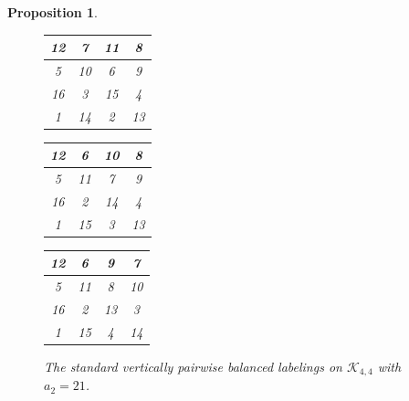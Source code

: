 \documentclass[10pt, reqno]{amsart}
\theoremstyle{definition}
\theoremstyle{plain}
\newtheorem{proposition}[definition]{Proposition}
\begin{document}
\begin{proposition}
\begin{figure}[hbt!]
    \centering
    \begin{tabular}{|c|c|c|c|} \hline
       12  &7  &11  &8  \\  \hline
        5  &10   &6   &9  \\  \hline
       16  &3   &15  &4  \\  \hline
        1  &14  &2   &13  \\  \hline
    \end{tabular}
\hspace{0.15in}\begin{tabular}{|c|c|c|c|} \hline
       12  &6 &10  &8  \\  \hline
        5  &11   &7   &9  \\  \hline
       16  &2   &14  &4  \\  \hline
        1  &15  &3   &13  \\  \hline
    \end{tabular}
\hspace{0.15in}\begin{tabular}{|c|c|c|c|} \hline
       12  &6  &9  &7  \\  \hline
        5  &11   &8   &10  \\  \hline
       16  &2   &13  &3  \\  \hline
        1  &15  &4   &14  \\  \hline
    \end{tabular}
    \caption{The standard vertically pairwise balanced labelings on
    $\mathcal{K}_{4,4}$ with $a_2=21$.}
    \label{fig:StandVertLabelsA2=21}
\end{figure}



\end{proposition}
\end{document}
